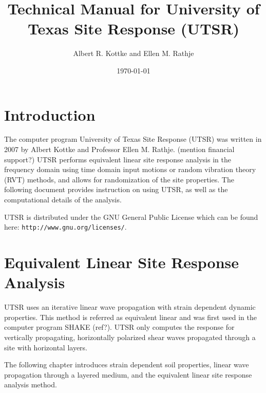 \documentclass[11pt]{report}
\title{Technical Manual for University of Texas Site Response (UTSR)}
\author{Albert R. Kottke and Ellen M. Rathje}
\date{\today}
\begin{document}
\maketitle
\tableofcontents
\listoffigures
\listoftables

\chapter{Introduction}
The computer program University of Texas Site Response (UTSR) was written in 2007 by Albert Kottke
and Professor Ellen M. Rathje.  (mention financial support?) UTSR performs equivalent linear site
response analysis in the frequency domain using time domain input motions or random vibration theory
(RVT) methods, and allows for randomization of the site properties. The following document provides
instruction on using UTSR, as well as the computational details of the analysis.

UTSR is distributed under the GNU General Public License which can be found here:
\texttt{http://www.gnu.org/licenses/}.

\chapter{Equivalent Linear Site Response Analysis}
UTSR uses an iterative linear wave propagation with strain dependent dynamic properties.  This
method is referred as equivalent linear and was first used in the computer program SHAKE (ref?).
UTSR only computes the response for vertically propagating, horizontally polarized shear waves
propagated through a site with horizontal layers.

The following chapter introduces strain dependent soil properties, linear wave propagation through a
layered medium, and the equivalent linear site response analysis method.
\end{document}
